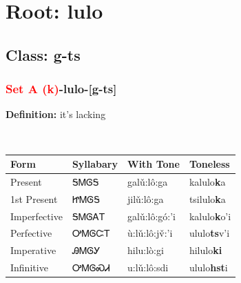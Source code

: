 \needspace{4in}
\section*{Root: lulo}
\nopagebreak
{}
\needspace{3in}
\subsection*{Class: g-ts}
\nopagebreak
\needspace{2in}
\subsubsection*{\textcolor{Red}{Set A (k)}{-}\textbf{lulo}{-}[g-ts]}
\nopagebreak
\textbf{Definition: } it{\textquoteright}s lacking
\\[0.5em]
\begin{tabularx}{\textwidth}{l X X X}%
\toprule%
\textbf{Form}&\textbf{Syllabary}&\textbf{With Tone}&\textbf{Toneless}\\%
\midrule%
Present&ᎦᎷᎶᎦ&galǔ:lô:ga&kalulo\textbf{k}a\\%
1st Present&ᏥᎷᎶᎦ&jilǔ:lô:ga&tsilulo\textbf{k}a\\%
Imperfective&ᎦᎷᎶᎪᎢ&galǔ:lô:gó:’i&kalulo\textbf{k}o'i\\%
Perfective&ᎤᎷᎶᏨᎢ&ù:lǔ:lô:jv̌:’i&ululo\textbf{ts}v'i\\%
Imperative&ᎯᎷᎶᎩ&hilu:lò:gi&hilulo\textbf{ki}\\%
Infinitive&ᎤᎷᎶᏍᏗ&u:lǔ:lô:sdi&ululo\textbf{hst}i\\%
\bottomrule%
\end{tabularx}
\\[1em]